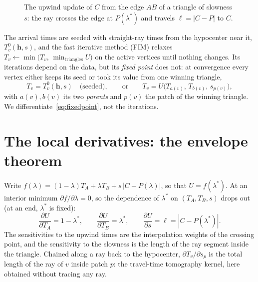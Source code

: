 \documentclass[11pt]{article}
\newcommand{\h}{\bm{h}}
\begin{document}
\begin{figure}[h]
\centering
{}
\caption{The upwind update of $C$ from the edge $AB$ of a triangle of slowness $s$: the ray
crosses the edge at $P(\lambda^\ast)$ and travels $\ell = |C - P|$ to $C$.}
\label{fig:update}
\end{figure}

The arrival times are seeded with straight-ray times from the hypocenter near it,
$T^0_v(\h, s)$, and the fast iterative method (FIM) relaxes
$T_v \leftarrow \min\big(T_v,\, \min_{\text{triangles}} U\big)$ on the active vertices until nothing
changes. Its iterations depend on the data, but its \emph{fixed point} does not: at
convergence every vertex either keeps its seed or took its value from one winning triangle,
\begin{equation}
T_v = T^0_v(\h, s) \quad\text{(seeded)}, \qquad\text{or}\qquad
T_v = U\big(T_{a(v)},\, T_{b(v)},\, s_{p(v)}\big),
\label{eq:fixedpoint}
\end{equation}
with $a(v), b(v)$ its two \emph{parents} and $p(v)$ the patch of the winning triangle. We
differentiate~\eqref{eq:fixedpoint}, not the iterations.

\section{The local derivatives: the envelope theorem}

Write $f(\lambda) = (1-\lambda)T_A + \lambda T_B + s\,|C-P(\lambda)|$, so that $U = f(\lambda^\ast)$.
At an interior minimum $\partial f/\partial\lambda = 0$, so the dependence of $\lambda^\ast$ on
$(T_A, T_B, s)$ drops out (at an end, $\lambda^\ast$ is fixed):
\begin{equation}
\frac{\partial U}{\partial T_A} = 1 - \lambda^\ast, \qquad
\frac{\partial U}{\partial T_B} = \lambda^\ast, \qquad
\frac{\partial U}{\partial s} = \ell = |C - P(\lambda^\ast)|.
\label{eq:local}
\end{equation}
The sensitivities to the upwind times are the interpolation weights of the crossing point, and the
sensitivity to the slowness is the length of the ray segment inside the triangle. Chained along a
ray back to the hypocenter, $\partial T_v/\partial s_p$ is the total length of the ray of $v$
inside patch $p$: the travel-time tomography kernel, here obtained without tracing any ray.
\end{document}
